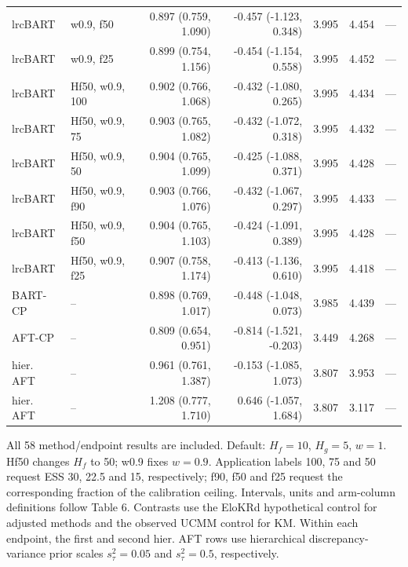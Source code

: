 \begin{landscape}
\begin{longtable}{llrrrrr}
lrcBART & w0.9, f50 & 0.897 (0.759, 1.090) & -0.457 (-1.123, 0.348) & 3.995 & 4.454 & --- \\
lrcBART & w0.9, f25 & 0.899 (0.754, 1.156) & -0.454 (-1.154, 0.558) & 3.995 & 4.452 & --- \\
lrcBART & Hf50, w0.9, 100 & 0.902 (0.766, 1.068) & -0.432 (-1.080, 0.265) & 3.995 & 4.434 & --- \\
lrcBART & Hf50, w0.9, 75 & 0.903 (0.765, 1.082) & -0.432 (-1.072, 0.318) & 3.995 & 4.432 & --- \\
lrcBART & Hf50, w0.9, 50 & 0.904 (0.765, 1.099) & -0.425 (-1.088, 0.371) & 3.995 & 4.428 & --- \\
lrcBART & Hf50, w0.9, f90 & 0.903 (0.766, 1.076) & -0.432 (-1.067, 0.297) & 3.995 & 4.433 & --- \\
lrcBART & Hf50, w0.9, f50 & 0.904 (0.765, 1.103) & -0.424 (-1.091, 0.389) & 3.995 & 4.428 & --- \\
lrcBART & Hf50, w0.9, f25 & 0.907 (0.758, 1.174) & -0.413 (-1.136, 0.610) & 3.995 & 4.418 & --- \\
BART-CP & -- & 0.898 (0.769, 1.017) & -0.448 (-1.048, 0.073) & 3.985 & 4.439 & --- \\
AFT-CP & -- & 0.809 (0.654, 0.951) & -0.814 (-1.521, -0.203) & 3.449 & 4.268 & --- \\
hier. AFT & -- & 0.961 (0.761, 1.387) & -0.153 (-1.085, 1.073) & 3.807 & 3.953 & --- \\
hier. AFT & -- & 1.208 (0.777, 1.710) & 0.646 (-1.057, 1.684) & 3.807 & 3.117 & --- \\
\end{longtable}
\noindent\begin{minipage}{\linewidth}\footnotesize All 58 method/endpoint results are included. Default: $H_f=10$, $H_g=5$, $w=1$. Hf50 changes $H_f$ to 50; w0.9 fixes $w=0.9$. Application labels 100, 75 and 50 request ESS 30, 22.5 and 15, respectively; f90, f50 and f25 request the corresponding fraction of the calibration ceiling. Intervals, units and arm-column definitions follow Table 6. Contrasts use the EloKRd hypothetical control for adjusted methods and the observed UCMM control for KM. Within each endpoint, the first and second hier. AFT rows use hierarchical discrepancy-variance prior scales $s_\tau^2=0.05$ and $s_\tau^2=0.5$, respectively.\end{minipage}
\endgroup
\end{landscape}
